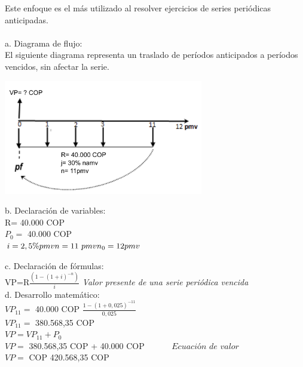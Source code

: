 	Este enfoque es el más utilizado al resolver ejercicios de series periódicas anticipadas.
	\\\\
	a. Diagrama de flujo:\\

	El siguiente diagrama representa un traslado de períodos anticipados a períodos vencidos, sin afectar la serie.
	\begin{center}
		\includegraphics[height=5cm]{4_Capitulo/img/ejemplos/4_20.pdf}
	\end{center}

	b. Declaración de variables:\\


R= 40.000 COP\\
$P_{0}=$ 40.000 COP\\
$i=2,5\% pmv \\
n={11}\ pmv\\
n_{0}=12 pmv\\
$

	c. Declaración de fórmulas:\\

	VP=R$\frac{(1-(1+i)^{-n})}{i}$ \hspace{35pt}\textit{Valor  presente de  una  serie  periódica  vencida}\\


	d. Desarrollo matemático: \\

$VP_{11}=$ 40.000 COP $\frac{1-(1+0,025)^{-11}}{0,025}$\\
$VP_{11}=$ 380.568,35 COP\\
$VP=VP_{11}+P_{0}$\\
$VP=$ 380.568,35 COP + 40.000 COP $\hspace{35pt}\textit{Ecuación de valor}$\\
$VP=$ COP 420.568,35 COP\\


	


